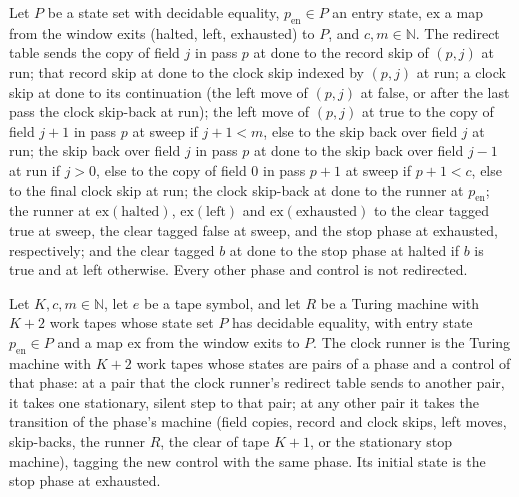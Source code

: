 \begin{definition}
\label{Turing.cw_red}
\leanok
{}
Let $P$ be a state set with decidable equality, $p_{\mathrm{en}}\in P$ an entry state,
$\mathrm{ex}$ a map from the window exits (halted, left, exhausted) to $P$, and
$c,m\in\mathbb{N}$. The redirect table sends the copy of field $j$ in pass $p$ at done to the
record skip of $(p,j)$ at run; that record skip at done to the clock skip indexed by $(p,j)$ at
run; a clock skip at done to its continuation (the left move of $(p,j)$ at false, or after the
last pass the clock skip-back at run); the left move of $(p,j)$ at true to the copy of field
$j+1$ in pass $p$ at sweep if $j+1<m$, else to the skip back over field $j$ at run; the skip
back over field $j$ in pass $p$ at done to the skip back over field $j-1$ at run if $j>0$, else
to the copy of field $0$ in pass $p+1$ at sweep if $p+1<c$, else to the final clock skip at
run; the clock skip-back at done to the runner at $p_{\mathrm{en}}$; the runner at
$\mathrm{ex}(\text{halted})$, $\mathrm{ex}(\text{left})$ and $\mathrm{ex}(\text{exhausted})$ to
the clear tagged true at sweep, the clear tagged false at sweep, and the stop phase at
exhausted, respectively; and the clear tagged $b$ at done to the stop phase at halted if $b$ is
true and at left otherwise. Every other phase and control is not redirected.
\end{definition}

\begin{definition}
\label{Turing.cw_hostTM}
\leanok
{}
Let $K,c,m\in\mathbb{N}$, let $e$ be a tape symbol, and let $R$ be a Turing machine with $K+2$
work tapes whose state set $P$ has decidable equality, with entry state $p_{\mathrm{en}}\in P$
and a map $\mathrm{ex}$ from the window exits to $P$. The clock runner is the Turing machine
with $K+2$ work tapes whose states are pairs of a phase and a control of that phase: at a pair
that the clock runner's redirect table sends to another pair, it takes one stationary, silent
step to that pair; at any other pair it takes the transition of the phase's machine (field
copies, record and clock skips, left moves, skip-backs, the runner $R$, the clear of tape
$K+1$, or the stationary stop machine), tagging the new control with the same phase. Its
initial state is the stop phase at exhausted.
\end{definition}

